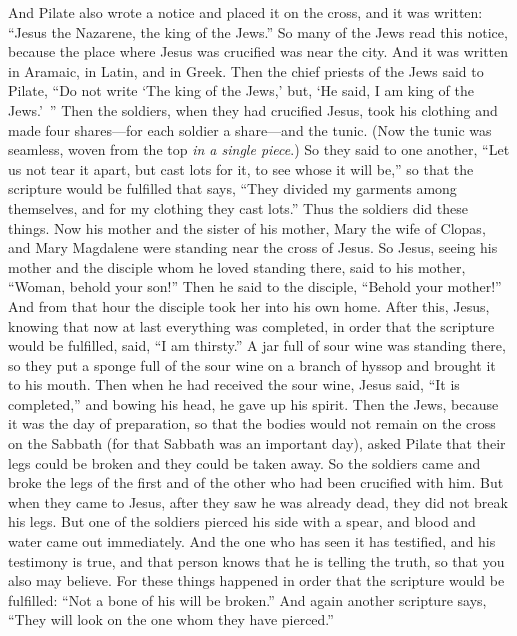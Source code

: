\begin{biblechapter}
\verse And Pilate also wrote a notice and placed it on the cross, and it was written: “Jesus the Nazarene, the king of the Jews.”
\verse So many of the Jews read this notice, because the place where Jesus was crucified was near the city. And it was written in Aramaic, in Latin, and in Greek.
\verse Then the chief priests of the Jews said to Pilate, “Do not write ‘The king of the Jews,’ but, ‘He said, I am king of the Jews.’ ”
\verse Then the soldiers, when they had crucified Jesus, took his clothing and made four shares—for each soldier a share—and the tunic. (Now the tunic was seamless, woven from the top \textit{in a single piece}.)
\verse So they said to one another, “Let us not tear it apart, but cast lots for it, to see whose it will be,” so that the scripture would be fulfilled that says, “They divided my garments among themselves, 
and for my clothing they cast lots.” Thus the soldiers did these things.
\verse Now his mother and the sister of his mother, Mary the wife of Clopas, and Mary Magdalene were standing near the cross of Jesus.
\verse So Jesus, seeing his mother and the disciple whom he loved standing there, said to his mother, “Woman, behold your son!”
\verse Then he said to the disciple, “Behold your mother!” And from that hour the disciple took her into his own home.
 After this, Jesus, knowing that now at last everything was completed, in order that the scripture would be fulfilled, said, “I am thirsty.”
\verse A jar full of sour wine was standing there, so they put a sponge full of the sour wine on a branch of hyssop and brought it to his mouth.
\verse Then when he had received the sour wine, Jesus said, “It is completed,” and bowing his head, he gave up his spirit.
\verse Then the Jews, because it was the day of preparation, so that the bodies would not remain on the cross on the Sabbath (for that Sabbath was an important day), asked Pilate that their legs could be broken and they could be taken away.
\verse So the soldiers came and broke the legs of the first and of the other who had been crucified with him.
\verse But when they came to Jesus, after they saw he was already dead, they did not break his legs.
\verse But one of the soldiers pierced his side with a spear, and blood and water came out immediately.
\verse And the one who has seen it has testified, and his testimony is true, and that person knows that he is telling the truth, so that you also may believe.
\verse For these things happened in order that the scripture would be fulfilled: “Not a bone of his will be broken.”
\verse And again another scripture says, “They will look on the one whom they have pierced.”

\end{biblechapter}
